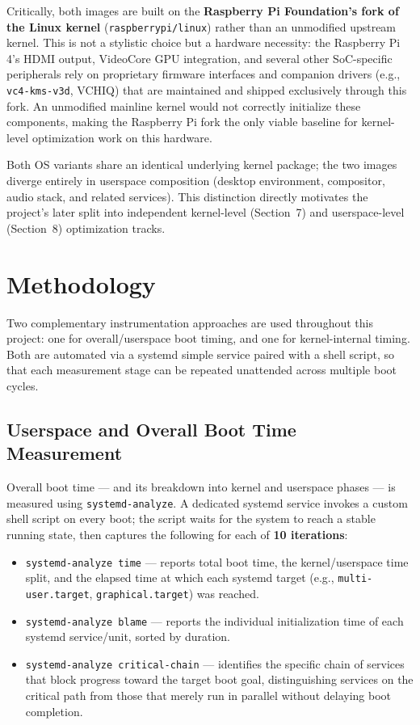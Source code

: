 \documentclass[11pt,a4paper]{article}
\begin{document}
Critically, both images are built on the \textbf{Raspberry Pi Foundation's fork of the Linux kernel} (\texttt{raspberrypi/linux}) rather than an unmodified upstream kernel. This is not a stylistic choice but a hardware necessity: the Raspberry Pi 4's HDMI output, VideoCore GPU integration, and several other SoC-specific peripherals rely on proprietary firmware interfaces and companion drivers (e.g., \texttt{vc4-kms-v3d}, VCHIQ) that are maintained and shipped exclusively through this fork. An unmodified mainline kernel would not correctly initialize these components, making the Raspberry Pi fork the only viable baseline for kernel-level optimization work on this hardware.

Both OS variants share an identical underlying kernel package; the two images diverge entirely in userspace composition (desktop environment, compositor, audio stack, and related services). This distinction directly motivates the project's later split into independent kernel-level (Section~7) and userspace-level (Section~8) optimization tracks.

\section{Methodology}

Two complementary instrumentation approaches are used throughout this project: one for overall/userspace boot timing, and one for kernel-internal timing. Both are automated via a systemd simple service paired with a shell script, so that each measurement stage can be repeated unattended across multiple boot cycles.

\subsection{Userspace and Overall Boot Time Measurement}

Overall boot time — and its breakdown into kernel and userspace phases — is measured using \texttt{systemd-analyze}. A dedicated systemd service invokes a custom shell script on every boot; the script waits for the system to reach a stable running state, then captures the following for each of \textbf{10 iterations}:

\begin{itemize}
    \item \texttt{systemd-analyze time} — reports total boot time, the kernel/userspace time split, and the elapsed time at which each systemd target (e.g., \texttt{multi-user.target}, \texttt{graphical.target}) was reached.
    \item \texttt{systemd-analyze blame} — reports the individual initialization time of each systemd service/unit, sorted by duration.
    \item \texttt{systemd-analyze critical-chain} — identifies the specific chain of services that block progress toward the target boot goal, distinguishing services on the critical path from those that merely run in parallel without delaying boot completion.
\end{itemize}
\end{document}
